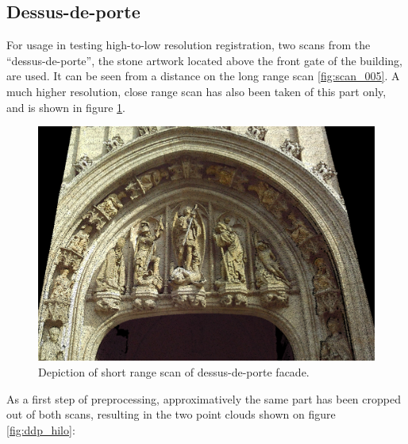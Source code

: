 \subsection{Dessus-de-porte}
For usage in testing high-to-low resolution registration, two scans from the ``dessus-de-porte'', the stone artwork located above the front gate of the building, are used. It can be seen from a distance on the long range scan \ref{fig:scan_005}. A much higher resolution, close range scan has also been taken of this part only, and is shown in figure \ref{fig:scan_012}.

\begin{figure}[h]
\centering
\includegraphics[width=.6\textwidth]{fig/scan_012.png}
\caption{Depiction of short range scan of dessus-de-porte facade.}
\label{fig:scan_012}
\end{figure}

As a 	first step of preprocessing, approximatively the same part has been cropped out of both scans, resulting in the two point clouds shown on figure \ref{fig:ddp_hilo}:

